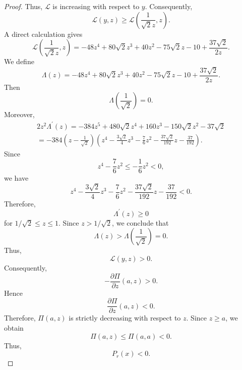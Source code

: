 \documentclass[11pt,a4paper]{article}
\numberwithin{equation}{section}
\numberwithin{table}{section}
\theoremstyle{plain}
\theoremstyle{definition}\newtheorem{definition}[theorem]{Definition}
\theoremstyle{remark}\newtheorem{remark}[theorem]{Remark}
\begin{document}
\begin{proof}
Thus, $\mathcal{L}$ is increasing with respect to $y$. Consequently, 
\begin{equation*}
\mathcal{L}(y,z)\geq \mathcal{L}\left(\frac1{\sqrt2 z},z\right).
\end{equation*}
A direct calculation gives 
\begin{equation*}
\mathcal{L}\left(\frac1{\sqrt2 z},z\right)=-48z^4+80\sqrt2
z^3+40z^2-75\sqrt2 z-10+\frac{37\sqrt2}{2z}.
\end{equation*}
We define 
\begin{equation*}
\Lambda(z)=-48z^4+80\sqrt2 z^3+40z^2-75\sqrt2 z-10+\frac{37\sqrt2}{2z}.
\end{equation*}
Then 
\begin{equation*}
\Lambda\left(\frac1{\sqrt2}\right)=0.
\end{equation*}
Moreover, 
\begin{equation*}
\begin{array}{l}
2z^2\Lambda^{\prime}(z)=-384z^5+480\sqrt2 z^4+160z^3-150\sqrt2 z^2-37\sqrt2
\\ 
=-384\left(z-\frac1{\sqrt2}\right)\left(z^4-\frac{3\sqrt2}{4}z^3-\frac76z^2-%
\frac{37\sqrt2}{192}z-\frac{37}{192}\right).%
\end{array}%
\end{equation*}
Since 
\begin{equation*}
z^4-\frac76z^2\leq -\frac16z^2<0,
\end{equation*}
we have 
\begin{equation*}
z^4-\frac{3\sqrt2}{4}z^3-\frac76z^2-\frac{37\sqrt2}{192}z-\frac{37}{192}<0.
\end{equation*}
Therefore, 
\begin{equation*}
\Lambda^{\prime}(z)\geq0
\end{equation*}
for $1/\sqrt2\leq z\leq1$. Since $z>1/\sqrt2$, we conclude that 
\begin{equation*}
\Lambda(z)>\Lambda\left(\frac1{\sqrt2}\right)=0.
\end{equation*}
Thus, 
\begin{equation*}
\mathcal{L}(y,z)>0.
\end{equation*}
Consequently, 
\begin{equation*}
-\frac{\partial \Pi}{\partial z}(a,z)>0.
\end{equation*}
Hence 
\begin{equation*}
\frac{\partial \Pi}{\partial z}(a,z)<0.
\end{equation*}
Therefore, $\Pi(a,z)$ is strictly decreasing with respect to $z$.
Since $z\geq a$, we obtain 
\begin{equation*}
\Pi(a,z)\leq\Pi(a,a)<0.
\end{equation*}
Thus, 
\begin{equation*}
P_r(x)<0.
\end{equation*}
\end{proof}
\end{document}
